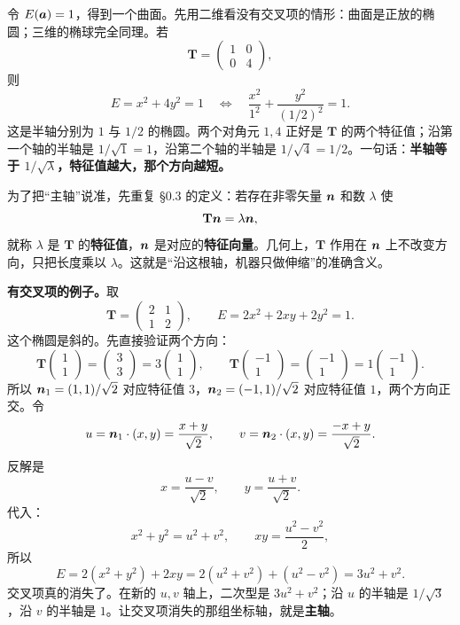 \documentclass[11pt]{ctexart}
\newcommand{\ten}[1]{\mathbf{#1}}
\let\origsubhdr\subhdr
\renewcommand{\subhdr}[1]{\par\needspace{3\baselineskip}\origsubhdr{#1}}
\begin{document}

令 $E(\boldsymbol{a})=1$，得到一个曲面。先用二维看没有交叉项的情形：曲面是正放的椭圆；三维的椭球完全同理。若
\[
\ten T=\begin{pmatrix}1&0\\0&4\end{pmatrix},
\]
则
\[
E=x^2+4y^2=1
\quad\Longleftrightarrow\quad
\frac{x^2}{1^2}+\frac{y^2}{(1/2)^2}=1 .
\]
这是半轴分别为 $1$ 与 $1/2$ 的椭圆。两个对角元 $1,4$ 正好是 $\ten T$ 的两个特征值；沿第一个轴的半轴是 $1/\sqrt1=1$，沿第二个轴的半轴是 $1/\sqrt4=1/2$。一句话：\textbf{半轴等于 $1/\sqrt{\lambda}$，特征值越大，那个方向越短。}

为了把“主轴”说准，先重复 §0.3 的定义：若存在非零矢量 $\boldsymbol{n}$ 和数 $\lambda$ 使
\[
\ten T\vect n=\lambda\vect n,
\]
就称 $\lambda$ 是 $\ten T$ 的\textbf{特征值}，$\boldsymbol{n}$ 是对应的\textbf{特征向量}。几何上，$\ten T$ 作用在 $\boldsymbol{n}$ 上不改变方向，只把长度乘以 $\lambda$。这就是“沿这根轴，机器只做伸缩”的准确含义。

\textbf{有交叉项的例子。}取
\[
\ten T=\begin{pmatrix}2&1\\1&2\end{pmatrix},
\qquad
E=2x^2+2xy+2y^2=1 .
\]
这个椭圆是斜的。先直接验证两个方向：
\[
\ten T\begin{pmatrix}1\\1\end{pmatrix}
=\begin{pmatrix}3\\3\end{pmatrix}
=3\begin{pmatrix}1\\1\end{pmatrix},
\qquad
\ten T\begin{pmatrix}-1\\1\end{pmatrix}
=\begin{pmatrix}-1\\1\end{pmatrix}
=1\begin{pmatrix}-1\\1\end{pmatrix}.
\]
所以 $\boldsymbol{n}_1=(1,1)/\sqrt2$ 对应特征值 $3$，$\boldsymbol{n}_2=(-1,1)/\sqrt2$ 对应特征值 $1$，两个方向正交。令
\[
u=\boldsymbol{n}_1\cdot(x,y)=\frac{x+y}{\sqrt2},
\qquad
v=\boldsymbol{n}_2\cdot(x,y)=\frac{-x+y}{\sqrt2}.
\]
反解是
\[
x=\frac{u-v}{\sqrt2},\qquad y=\frac{u+v}{\sqrt2}.
\]
代入：
\[
x^2+y^2=u^2+v^2,\qquad
xy=\frac{u^2-v^2}{2},
\]
所以
\[
E=2(x^2+y^2)+2xy
=2(u^2+v^2)+(u^2-v^2)
=3u^2+v^2 .
\]
交叉项真的消失了。在新的 $u,v$ 轴上，二次型是 $3u^2+v^2$；沿 $u$ 的半轴是 $1/\sqrt3$，沿 $v$ 的半轴是 $1$。让交叉项消失的那组坐标轴，就是\textbf{主轴}。
\end{document}
